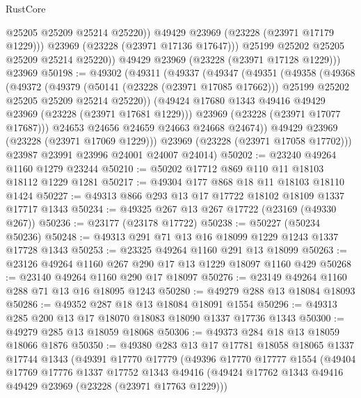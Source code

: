 \begin{lexlean}{RustCore}
\begin{coremodule}
                  @25205
                  @25209
                  @25214
                  @25220))
              @49429
              @23969
              (@23228 (@23971 @17179 @1229)))
            @23969
            (@23228 (@23971 @17136 @17647)))
          @25199
          @25202
          @25205
          @25209
          @25214
          @25220))
      @49429
      @23969
      (@23228 (@23971 @17128 @1229)))
    @23969
@50198 := @49302
    (@49311
      (@49337
        (@49347
          (@49351
            (@49358
              (@49368
                (@49372
                  (@49379
                    (@50141 (@23228 (@23971 @17085 @17662)))
                    @25199
                    @25202
                    @25205
                    @25209
                    @25214
                    @25220))
                (@49424 @17680 @1343 @49416 @49429 @23969 (@23228 (@23971 @17681 @1229)))
                @23969
                (@23228 (@23971 @17077 @17687)))
              @24653
              @24656
              @24659
              @24663
              @24668
              @24674))
          @49429
          @23969
          (@23228 (@23971 @17069 @1229)))
        @23969
        (@23228 (@23971 @17058 @17702)))
      @23987
      @23991
      @23996
      @24001
      @24007
      @24014)
@50202 := @23240 @49264 @1160 @1279 @23244
@50210 := @50202 @17712 @869 @110 @11 @18103 @18112 @1229 @1281
@50217 := @49304 @177 @868 @18 @11 @18103 @18110 @1424
@50227 := @49313 @866 @293 @13 @17 @17722 @18102 @18109 @1337 @17717 @1343
@50234 := @49325 @267 @13 @267 @17722 (@23169 (@49330 @267))
@50236 := @23177 (@23178 @17722)
@50238 := @50227 (@50234 @50236)
@50248 := @49313 @291 @71 @13 @16 @18099 @1229 @1243 @1337 @17728 @1343
@50253 := @23325 @49264 @1160 @291 @13 @18099
@50263 := @23126 @49264 @1160 @267 @290 @17 @13 @1229 @18097 @1160 @429
@50268 := @23140 @49264 @1160 @290 @17 @18097
@50276 := @23149 @49264 @1160 @288 @71 @13 @16 @18095 @1243
@50280 := @49279 @288 @13 @18084 @18093
@50286 := @49352 @287 @18 @13 @18084 @18091 @1554
@50296 := @49313 @285 @200 @13 @17 @18070 @18083 @18090 @1337 @17736 @1343
@50300 := @49279 @285 @13 @18059 @18068
@50306 := @49373 @284 @18 @13 @18059 @18066 @1876
@50350 := @49380
    @283
    @13
    @17
    @17781
    @18058
    @18065
    @1337
    @17744
    @1343
    (@49391
      @17770
      @17779
      (@49396
        @17770
        @17777
        @1554
        (@49404
          @17769
          @17776
          @1337
          @17752
          @1343
          @49416
          (@49424 @17762 @1343 @49416 @49429 @23969 (@23228 (@23971 @17763 @1229)))

\end{coremodule}
\end{lexlean}
